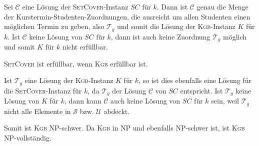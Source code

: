\documentclass{article}
\begin{document}
Sei $\mathcal{C}$ eine Lösung der \textsc{SetCover}-Instanz $SC$ für $k$. Dann ist $\mathcal{C}$ genau die Menge der Kurstermin-Studenten-Zuordnungen, die ausreicht um allen Studenten einen möglichen Termin zu geben, also $\mathcal{T}_g$ und somit die Lösung der \textsc{Kgb}-Instanz $K$ für $k$.
Ist $\mathcal{C}$ keine Lösung von $SC$ für $k$, dann ist auch keine Zuordnung $\mathcal{T}_g$ möglich und somit $K$ für $k$ nicht erfüllbar.

\smallskip

\textsc{SetCover} ist erfüllbar, wenn \textsc{Kgb} erfüllbar ist.

Ist $\mathcal{T}_g$ eine Lösung der \textsc{Kgb}-Instanz $K$ für $k$, so ist dies ebenfalls eine Lösung für die \textsc{SetCover}-Instanz für $k$, da $\mathcal{T}_g$ der Lösung $\mathcal{C}$ von $SC$ entspricht.
Ist $\mathcal{T}_g$ keine Lösung von $K$ für $k$, dann kann $\mathcal{C}$ auch keine Lösung von $SC$ für $k$ sein, weil $\mathcal{T}_g$ nicht alle Elemente in $\mathcal{S}$ bzw. $\mathcal{U}$ abdeckt.

\bigskip

Somit ist \textsc{Kgb} NP-schwer. Da \textsc{Kgb} in NP und ebenfalls NP-schwer ist, ist \textsc{Kgb} NP-vollständig.
\end{document}
